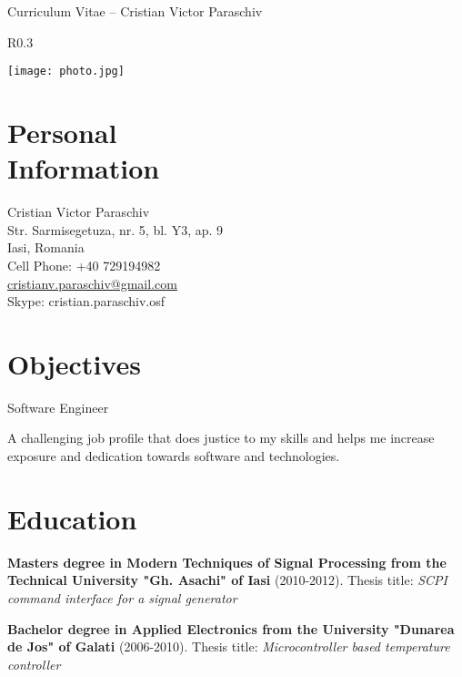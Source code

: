 \documentclass[margin,line,a4paper]{resume}
\begin{document}
{\sc \Large Curriculum Vitae -- Cristian Victor Paraschiv}
\begin{resume}
	\vspace{0.1cm}
	\begin{wrapfigure}{R}{0.3\textwidth}
        \vspace{-1cm}
       \begin{center}
        \texttt{[image: photo.jpg]}
       \end{center}
        \vspace{-1cm}
    \end{wrapfigure}
\section{\mysidestyle Personal\\Information}%
   	Cristian Victor Paraschiv\\
   	Str. Sarmisegetuza, nr. 5, bl. Y3, ap. 9\\
   	Iasi, Romania\\
   	Cell Phone: +40 729194982\\
   	\href{mailto:cristianv.paraschiv@gmail.com}{cristianv.paraschiv@gmail.com}\\
   	Skype: cristian.paraschiv.osf
   	
\section{\mysidestyle Objectives}%
	Software Engineer
	
	A challenging job profile that does justice to my skills and helps me increase exposure and dedication towards software and technologies.
\section{\mysidestyle Education}
	\textbf{Masters degree in Modern Techniques of Signal Processing from the Technical University "Gh. Asachi" of Iasi} (2010-2012). Thesis title: \textit{SCPI command interface for a signal generator}
	
	\textbf{Bachelor degree in Applied Electronics from the University "Dunarea de Jos" of Galati} (2006-2010). Thesis title: \textit{Microcontroller based temperature controller}
	

\end{resume}
\end{document}
